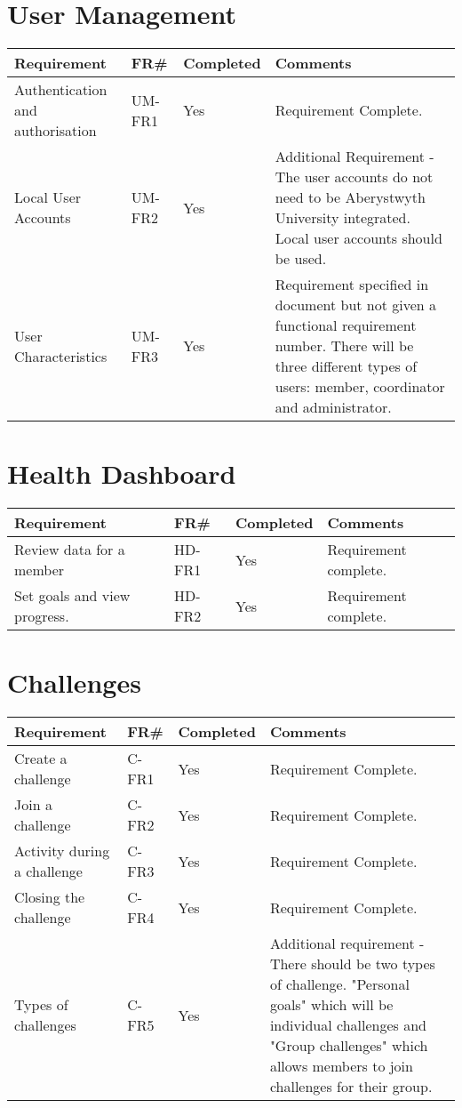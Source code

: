 \section{User Management}
\begin{tabular}{ |p{5cm}|l|l|p{8cm}|}
\hline
\textbf{Requirement}	&	\textbf{FR\#}	&	\textbf{Completed}	&	\textbf{Comments} \\
\hline
Authentication and authorisation 					& UM-FR1 	& Yes 		& Requirement Complete. \\
\hline
Local User Accounts 								& UM-FR2 	& Yes 		& Additional Requirement - The user accounts do not need to be Aberystwyth University integrated. Local user accounts should be used. \\
\hline
User Characteristics								& UM-FR3	& Yes		& Requirement specified in document but not given a functional requirement number. There will be three different types of users: member, coordinator and administrator. \\

\hline
\end{tabular}



\section{Health Dashboard}
\begin{tabular}{ |p{5cm}|l|l|p{8cm}|}
\hline
\textbf{Requirement}	&	\textbf{FR\#}	&	\textbf{Completed}	&	\textbf{Comments} \\
\hline
Review data for a member 							& HD-FR1 	& Yes 		& Requirement complete. \\
\hline
Set goals and view progress. 						& HD-FR2 	& Yes		& Requirement complete. \\

\hline
\end{tabular}


\section{Challenges}
\begin{tabular}{ |p{5cm}|l|l|p{8cm}|}
\hline
\textbf{Requirement}	&	\textbf{FR\#}	&	\textbf{Completed}	&	\textbf{Comments} \\
\hline
Create a challenge 									& C-FR1 	& Yes 		& Requirement Complete. \\
\hline
Join a challenge 									& C-FR2 	& Yes  		& Requirement Complete. \\
\hline
Activity during a challenge							& C-FR3 	& Yes 		& Requirement Complete. \\
\hline
Closing the challenge								& C-FR4		& Yes 		& Requirement Complete. \\
\hline
Types of challenges 								& C-FR5 	& Yes		& Additional requirement - There should be two types of challenge. "Personal goals" which will be individual challenges and "Group challenges" which allows members to join challenges for their group. \\

\hline
\end{tabular}


